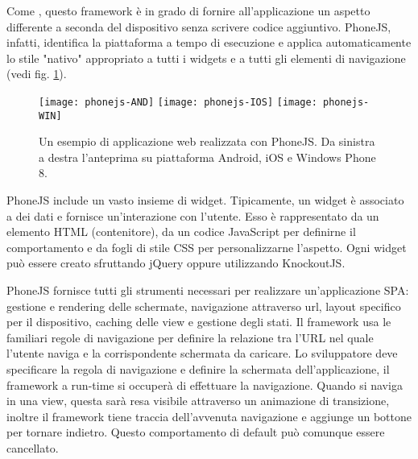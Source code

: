            Come \kendomob{}, questo frame\-work è in grado di fornire all'applicazione
            un aspetto differente a seconda del dispositivo senza scrivere codice aggiuntivo.
            PhoneJS, infatti, identifica la piattaforma a tempo di esecuzione
            e applica automaticamente
            lo stile "nativo" appropriato a tutti i widgets e a tutti gli elementi
            di navigazione (vedi fig. \ref{fig:phonejs}).

            \begin{figure}[h]
                \centering
                \texttt{[image: phonejs-AND]}
                \texttt{[image: phonejs-IOS]}
                \texttt{[image: phonejs-WIN]}
                \caption{
                    Un esempio di applicazione web realizzata con PhoneJS.
                    Da sinistra a destra l'anteprima su piattaforma Android, iOS
                    e Windows Phone 8.
                }
                \label{fig:phonejs}
            \end{figure}

            PhoneJS include un vasto insieme di widget. Tipicamente,
            un widget è associato a dei dati e fornisce un'interazione con l'utente.
            Esso è rappresentato da un elemento HTML (contenitore), da un codice
            JavaScript per definirne il comportamento e da fogli di stile CSS
            per personalizzarne l'aspetto.
            Ogni widget può essere creato sfruttando jQuery oppure utilizzando
            KnockoutJS.

            PhoneJS fornisce tutti gli strumenti necessari per realizzare un'applicazione
            SPA: gestione e rendering delle schermate, navigazione attraverso url,
            layout specifico per il dispositivo, caching delle view e gestione degli stati.
            Il frame\-work usa le familiari regole di navigazione per definire la
            relazione tra l'URL nel quale l'utente naviga e la corrispondente schermata
            da caricare. Lo sviluppatore deve specificare la regola di navigazione e definire
            la schermata dell'applicazione, il frame\-work a run-time si occuperà di effettuare la
            navigazione.
            Quando si naviga in una view, questa sarà resa visibile attraverso un
            animazione di transizione, inoltre il frame\-work tiene traccia dell'avvenuta
            navigazione e aggiunge un bottone per tornare indietro. Questo comportamento
            di default può comunque essere cancellato.

